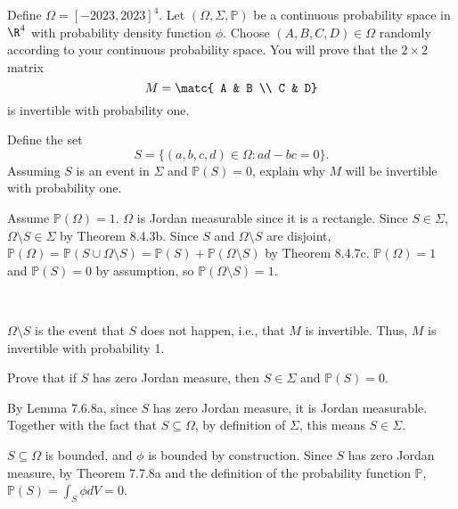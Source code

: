 \documentclass{exam}
\begin{document}
\begin{questions}
\begin{parts}
\end{parts}




\pagebreak
\question  Define $\Omega = [-2023,2023]^4$. Let $(\Omega,\Sigma,\mathbb{P})$ be a continuous probability space in $\R^4$ with probability density function $\phi$. 
Choose $(A,B,C,D) \in \Omega$ randomly according to your continuous probability space. You will prove that the $2 \times 2$ matrix
\[
M = \matc{ A & B \\ C & D} 
\]
is invertible with probability one. 
\begin{parts}

\item Define the set
\[
S = \{ (a,b,c,d) \in \Omega : ad - bc = 0\}.
\]
Assuming $S$ is an event in $\Sigma$ and $\mathbb{P}(S) = 0$, explain why $M$ will be invertible with probability one. 

\begin{answer}{330pt}
Assume $\mathbb{P}(\Omega) = 1$. $\Omega$ is Jordan measurable since it is a rectangle. Since $S \in \Sigma$, $\Omega \setminus S \in \Sigma$ by Theorem 8.4.3b. Since $S$ and $\Omega \setminus S$ are disjoint, $\mathbb{P}(\Omega) = \mathbb{P}(S \cup \Omega \setminus S) = \mathbb{P}(S) + \mathbb{P}(\Omega \setminus S)$ by Theorem 8.4.7c. $\mathbb{P}(\Omega) = 1$ and $\mathbb{P}(S) = 0$ by assumption, so $\mathbb{P}(\Omega \setminus S) = 1$.\

\

$\Omega \setminus S$ is the event that $S$ does not happen, i.e., that $M$ is invertible. Thus, $M$ is invertible with probability 1.
\end{answer}

\item Prove that if $S$ has zero Jordan measure, then $S \in \Sigma$ and $\mathbb{P}(S) = 0$. 

\begin{answer}{150pt}
By Lemma 7.6.8a, since $S$ has zero Jordan measure, it is Jordan measurable. Together with the fact that $S \subseteq \Omega$, by definition of $\Sigma$, this means $S \in \Sigma$.\newline\

$S \subseteq \Omega$ is bounded, and $\phi$ is bounded by construction. Since $S$ has zero Jordan measure, by Theorem 7.7.8a and the definition of the probability function $\mathbb{P}$, $\mathbb{P}(S) = \int_S \phi dV = 0$.
\end{answer}



\end{parts}
\end{questions}
\end{document}
